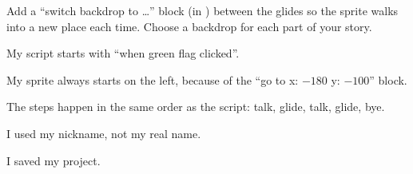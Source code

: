 \begin{creative}
Add a \enquote{switch backdrop to \ldots} block (in ) between the glides so the sprite walks into a new place each time. Choose a backdrop for each part of your story.
\end{creative}

\begin{selfcheck}
  \item My script starts with \enquote{when green flag clicked}.
  \item My sprite always starts on the left, because of the \enquote{go to x: $-180$ y: $-100$} block.
  \item The steps happen in the same order as the script: talk, glide, talk, glide, bye.
  \item I used my nickname, not my real name.
  \item I saved my project.
\end{selfcheck}
